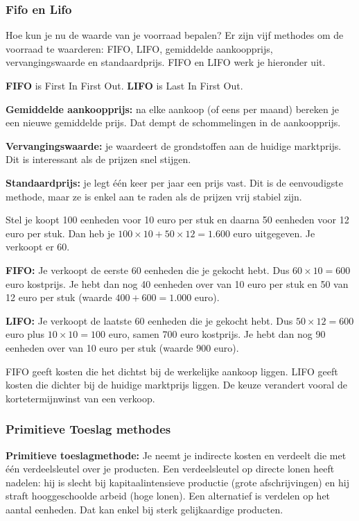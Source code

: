\documentclass[a4paper,11pt]{article}
\begin{document}
\subsubsection{Fifo en Lifo}

\begin{conceptbox}


    Hoe kun je nu de waarde van je voorraad bepalen?
    Er zijn vijf methodes om de voorraad te waarderen: FIFO, LIFO, gemiddelde aankoopprijs,
    vervangingswaarde en standaardprijs. FIFO en LIFO werk je hieronder uit.

    \textbf{FIFO} is First In First Out.
    \textbf{LIFO} is Last In First Out.

    \textbf{Gemiddelde aankoopprijs:} na elke aankoop (of eens per maand) bereken je een nieuwe gemiddelde prijs.
    Dat dempt de schommelingen in de aankoopprijs.

    \textbf{Vervangingswaarde:} je waardeert de grondstoffen aan de huidige marktprijs.
    Dit is interessant als de prijzen snel stijgen.

    \textbf{Standaardprijs:} je legt één keer per jaar een prijs vast.
    Dit is de eenvoudigste methode, maar ze is enkel aan te raden als de prijzen vrij stabiel zijn.
\end{conceptbox}


Stel je koopt 100 eenheden voor 10 euro per stuk en daarna 50 eenheden voor 12 euro per stuk.
Dan heb je $100 \times 10 + 50 \times 12 = 1.600$ euro uitgegeven.
Je verkoopt er 60.
\newline

\textbf{FIFO:}
Je verkoopt de eerste 60 eenheden die je gekocht hebt.
Dus $60 \times 10 = 600$ euro kostprijs.
Je hebt dan nog 40 eenheden over van 10 euro per stuk en 50 van 12 euro per stuk (waarde $400 + 600 = 1.000$ euro).
\newline

\textbf{LIFO:}
Je verkoopt de laatste 60 eenheden die je gekocht hebt.
Dus $50 \times 12 = 600$ euro plus $10 \times 10 = 100$ euro, samen 700 euro kostprijs.
Je hebt dan nog 90 eenheden over van 10 euro per stuk (waarde 900 euro).
\newline

FIFO geeft kosten die het dichtst bij de werkelijke aankoop liggen.
LIFO geeft kosten die dichter bij de huidige marktprijs liggen.
De keuze verandert vooral de kortetermijnwinst van een verkoop.


\subsubsection{Primitieve Toeslag methodes}
\textbf{Primitieve toeslagmethode:}
Je neemt je indirecte kosten en verdeelt die met één verdeelsleutel over je producten.
Een verdeelsleutel op directe lonen heeft nadelen:
hij is slecht bij kapitaalintensieve productie (grote afschrijvingen)
en hij straft hooggeschoolde arbeid (hoge lonen).
Een alternatief is verdelen op het aantal eenheden.
Dat kan enkel bij sterk gelijkaardige producten.
\end{document}
